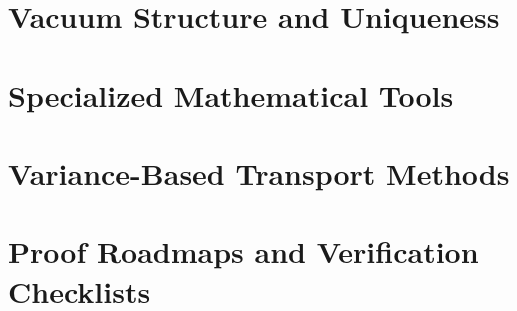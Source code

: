 \documentclass[11pt,a4paper]{report}
\begin{document}
\chapter{Vacuum Structure and Uniqueness}
\label{ch:vacuum}




\chapter{Specialized Mathematical Tools}
\label{ch:novel-tools}







\chapter{Variance-Based Transport Methods}
\label{ch:variance}


\chapter{Proof Roadmaps and Verification Checklists}
\label{ch:roadmaps}













\end{document}
